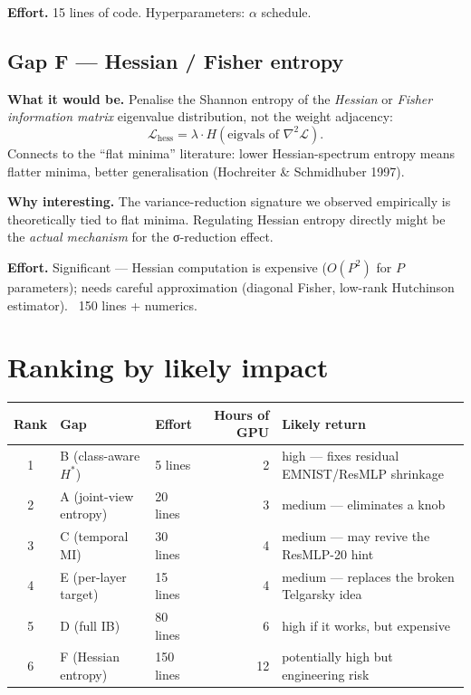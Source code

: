 \documentclass[11pt,a4paper]{article}
\begin{document}
\textbf{Effort.} 15 lines of code. Hyperparameters: $\alpha$ schedule.

\subsection{Gap F — Hessian / Fisher entropy}

\textbf{What it would be.} Penalise the Shannon entropy of the
\emph{Hessian} or \emph{Fisher information matrix} eigenvalue
distribution, not the weight adjacency:
\[
\mathcal{L}_{\text{hess}} = \lambda \cdot H(\text{eigvals of } \nabla^2 \mathcal{L}).
\]
Connects to the ``flat minima'' literature: lower Hessian-spectrum
entropy means flatter minima, better generalisation
(Hochreiter \& Schmidhuber 1997).

\textbf{Why interesting.} The variance-reduction signature we
observed empirically is theoretically tied to flat minima. Regulating
Hessian entropy directly might be the \emph{actual mechanism} for the
σ-reduction effect.

\textbf{Effort.} Significant — Hessian computation is expensive
($O(P^2)$ for $P$ parameters); needs careful approximation
(diagonal Fisher, low-rank Hutchinson estimator). ~150 lines + numerics.

\section{Ranking by likely impact}

\begin{center}
\small
\begin{tabular}{@{}cllrl@{}}
\toprule
Rank & Gap & Effort & Hours of GPU & Likely return \\
\midrule
1 & B (class-aware $H^*$)        & 5 lines      & 2  & high — fixes residual EMNIST/ResMLP shrinkage \\
2 & A (joint-view entropy)       & 20 lines     & 3  & medium — eliminates a knob \\
3 & C (temporal MI)              & 30 lines     & 4  & medium — may revive the ResMLP-20 hint \\
4 & E (per-layer target)         & 15 lines     & 4  & medium — replaces the broken Telgarsky idea \\
5 & D (full IB)                  & 80 lines     & 6  & high if it works, but expensive \\
6 & F (Hessian entropy)          & 150 lines    & 12 & potentially high but engineering risk \\
\bottomrule
\end{tabular}
\end{center}
\end{document}
